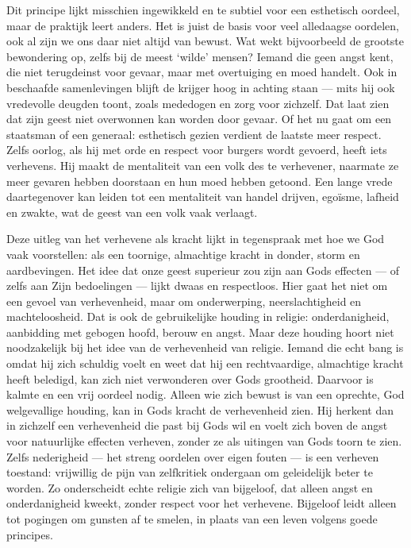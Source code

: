 \begin{mdframed}[leftmargin=0pt,rightmargin=0pt,backgroundcolor=blue!6,linecolor=white,innertopmargin=6pt,innerbottommargin=6pt]
Dit principe lijkt misschien ingewikkeld en te subtiel voor een esthetisch oordeel, maar de praktijk leert anders. Het is juist de basis voor veel alledaagse oordelen, ook al zijn we ons daar niet altijd van bewust. Wat wekt bijvoorbeeld de grootste bewondering op, zelfs bij de meest ‘wilde’ mensen? Iemand die geen angst kent, die niet terugdeinst voor gevaar, maar met overtuiging en moed handelt. Ook in beschaafde samenlevingen blijft de krijger hoog in achting staan — mits hij ook vredevolle deugden toont, zoals mededogen en zorg voor zichzelf. Dat laat zien dat zijn geest niet overwonnen kan worden door gevaar. Of het nu gaat om een staatsman of een generaal: esthetisch gezien verdient de laatste meer respect. Zelfs oorlog, als hij met orde en respect voor burgers wordt gevoerd, heeft iets verhevens. Hij maakt de mentaliteit van een volk des te verhevener, naarmate ze meer gevaren hebben doorstaan en hun moed hebben getoond. Een lange vrede daartegenover kan leiden tot een mentaliteit van handel drijven, egoïsme, lafheid en zwakte, wat de geest van een volk vaak verlaagt.

Deze uitleg van het verhevene als kracht lijkt in tegenspraak met hoe we God vaak voorstellen: als een toornige, almachtige kracht in donder, storm en aardbevingen. Het idee dat onze geest superieur zou zijn aan Gods effecten — of zelfs aan Zijn bedoelingen — lijkt dwaas en respectloos. Hier gaat het niet om een gevoel van verhevenheid, maar om onderwerping, neerslachtigheid en machteloosheid. Dat is ook de gebruikelijke houding in religie: onderdanigheid, aanbidding met gebogen hoofd, berouw en angst. Maar deze houding hoort niet noodzakelijk bij het idee van de verhevenheid van religie. Iemand die echt bang is omdat hij zich schuldig voelt en weet dat hij een rechtvaardige, almachtige kracht heeft beledigd, kan zich niet verwonderen over Gods grootheid. Daarvoor is kalmte en een vrij oordeel nodig. Alleen wie zich bewust is van een oprechte, God welgevallige houding, kan in Gods kracht de verhevenheid zien. Hij herkent dan in zichzelf een verhevenheid die past bij Gods wil en voelt zich boven de angst voor natuurlijke effecten verheven, zonder ze als uitingen van Gods toorn te zien. Zelfs nederigheid — het streng oordelen over eigen fouten — is een verheven toestand: vrijwillig de pijn van zelfkritiek ondergaan om geleidelijk beter te worden. Zo onderscheidt echte religie zich van bijgeloof, dat alleen angst en onderdanigheid kweekt, zonder respect voor het verhevene. Bijgeloof leidt alleen tot pogingen om gunsten af te smelen, in plaats van een leven volgens goede principes.


\end{mdframed}
